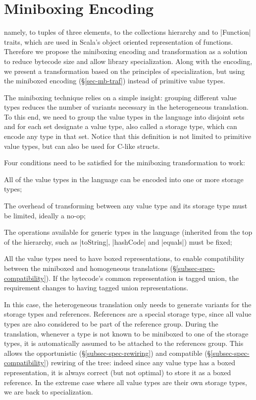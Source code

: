 \section{Miniboxing Encoding}
\label{sec-miniboxing}

 namely, to tuples of three elements, to the collections hierarchy and to |Function| traits, which are used in Scala's object oriented representation of functions. Therefore we propose the miniboxing encoding and transformation as a solution to reduce bytecode size and allow library specialization. Along with the encoding, we present a transformation based on the principles of specialization, but using the miniboxed encoding (\S\ref{sec-mb-traf}) instead of primitive value types. 

The miniboxing technique relies on a simple insight: grouping different value types reduces the number of variants necessary in the heterogeneous translation. To this end, we need to group the value types in the language into disjoint sets and for each set designate a value type, also called a storage type, which can encode any type in that set. Notice that this definition is not limited to primitive value types, but can also be used for C-like structs.

Four conditions need to be satisfied for the miniboxing transformation to work:
\begin{packed_item}
  \item All of the value types in the language can be encoded into one or more storage types;
  \item The overhead of transforming between any value type and its storage type must be limited, ideally a no-op;
  \item The operations available for generic types in the language (inherited from the top of the hierarchy, such as |toString|, |hashCode| and |equals|) must be fixed;
  \item All the value types need to have boxed representations, to enable compatibility between the miniboxed and homogeneous translations (\S\ref{subsec-spec-compatibility}). If the bytecode's common representation is tagged union, the requirement changes to having tagged union representations. 
\end{packed_item}

In this case, the heterogeneous translation only needs to generate variants for the storage types and references. References are a special storage type, since all value types are also considered to be part of the reference group. During the translation, whenever a type is not known to be miniboxed to one of the storage types, it is automatically assumed to be attached to the references group. This allows the opportunistic (\S\ref{subsec-spec-rewiring}) and compatible (\S\ref{subsec-spec-compatibility}) rewiring of the tree: indeed since any value type has a boxed representation, it is always correct (but not optimal) to store it as a boxed reference. In the extreme case where all value types are their own storage types, we are back to specialization.     

